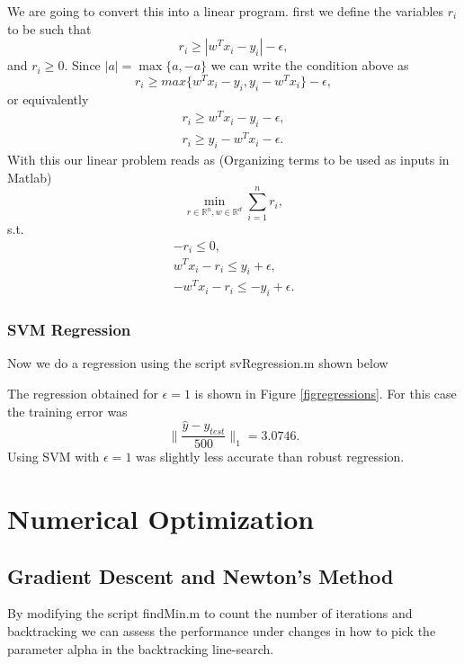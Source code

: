 \documentclass[11pt]{article}
\theoremstyle{plain}
\begin{document}
We are going to convert this into a linear program. first we define the variables $r_{i}$ to be such that
\begin{equation*}
r_{i}\geq |w^{T}x_{i}-y_{i}|-\epsilon,
\end{equation*}
and $r_{i}\geq 0$. Since $|a|=\max\{a,-a\}$ we can write the condition above as
\begin{equation*}
r_{i}\geq max\{w^{T}x_{i}-y_{i},y_{i}-w^{T}x_{i}\}-\epsilon,
\end{equation*}
or equivalently
\begin{eqnarray*}
r_{i}\geq w^{T}x_{i}-y_{i}-\epsilon,\\
r_{i}\geq y_{i}-w^{T}x_{i}-\epsilon.
\end{eqnarray*}
With this our linear problem reads as (Organizing terms to be used as inputs in Matlab)
\begin{equation*}
\min_{r\in\mathbb{R}^{n},w\in\mathbb{R}^{d}}\sum_{i=1}^{n} r_{i},
\end{equation*}
s.t.
\begin{eqnarray*}
-r_{i}\leq 0,\\
w^{T}x_{i}-r_{i}\leq y_{i}+\epsilon, \\
-w^{T}x_{i}-r_{i}\leq -y_{i}+\epsilon.
\end{eqnarray*}


\subsubsection{SVM Regression}
Now we do a regression using the script svRegression.m shown below



The regression obtained for $\epsilon=1$ is shown in Figure \ref{figregressions}. For this case 
the training error was
\begin{equation*}
\|\frac{\hat{y}-y_{test}}{500}\|_{1}=3.0746.
\end{equation*}
Using SVM with $\epsilon=1$ was slightly less accurate than robust regression.



\section{Numerical Optimization}
\subsection{Gradient Descent and Newton's Method}
By modifying the script findMin.m to count the number of iterations and backtracking we can 
assess the performance under changes in how to pick the parameter alpha in the backtracking line-search.
\end{document}

